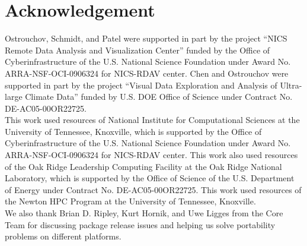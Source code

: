 
\section*{Acknowledgement}

Ostrouchov, Schmidt, and Patel were supported in part by the project
``NICS Remote Data Analysis and Visualization Center''
funded by the Office of Cyberinfrastructure of the
U.S. National Science Foundation
under Award No. ARRA-NSF-OCI-0906324 for NICS-RDAV center.
Chen and Ostrouchov were supported in part by the project
``Visual Data Exploration and Analysis of Ultra-large Climate Data''
funded by U.S. DOE Office of Science
under Contract No. DE-AC05-00OR22725.
\\

This work used resources of National Institute for Computational
Sciences at the University of Tennessee, Knoxville, which is supported
by the Office of Cyberinfrastructure of the U.S. National Science Foundation
under Award No. ARRA-NSF-OCI-0906324 for NICS-RDAV center.
This work also used resources of the Oak Ridge Leadership Computing Facility
at the Oak Ridge National Laboratory, which is supported by the Office of
Science of the U.S. Department of Energy under Contract No. DE-AC05-00OR22725.
This work used resources of the Newton HPC Program at the University of Tennessee, 
Knoxville. 
\\

We also thank Brian D. Ripley, Kurt Hornik, and Uwe Ligges from the
 Core Team for discussing package release issues and
helping us solve portability problems on different platforms.
\\
